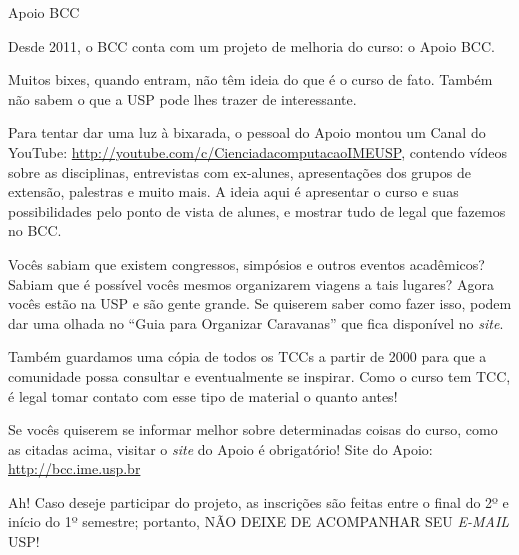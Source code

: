 \begin{subsubsecao}{Apoio BCC}

Desde 2011, o BCC conta com um projeto de melhoria do curso: o Apoio BCC.

Muitos bixes, quando entram, não têm ideia do que é o curso de fato. Também não
sabem o que a USP pode lhes trazer de interessante.

Para tentar dar uma luz à bixarada, o pessoal do Apoio montou um Canal do YouTube:
\url{http://youtube.com/c/CienciadacomputacaoIMEUSP}, contendo vídeos sobre as disciplinas,
entrevistas com ex-alunes, apresentações dos grupos de extensão, palestras e muito
mais. A ideia aqui é apresentar o curso e suas possibilidades pelo ponto de vista
de alunes, e mostrar tudo de legal que fazemos no BCC.

Vocês sabiam que existem congressos, simpósios e outros eventos acadêmicos?
Sabiam que é possível vocês mesmos organizarem viagens a tais lugares? Agora
vocês estão na USP e são gente grande. Se quiserem saber como fazer isso, podem 
dar uma olhada no ``Guia para Organizar Caravanas'' que fica disponível 
no \textit{site}.

Também guardamos uma cópia de todos os TCCs a partir de 2000 para que a 
comunidade possa consultar e eventualmente se inspirar. Como o curso tem TCC, é 
legal tomar contato com esse tipo de material o quanto antes!

Se vocês quiserem se informar melhor sobre determinadas coisas do curso, como as
citadas acima, visitar o \textit{site} do Apoio é obrigatório! Site do Apoio: \url{http://bcc.ime.usp.br}

Ah! Caso deseje participar do projeto, as inscrições são feitas entre
o final do 2º e início do 1º semestre;
portanto, NÃO DEIXE DE ACOMPANHAR SEU
\textit{E-MAIL} USP!

\end{subsubsecao}
